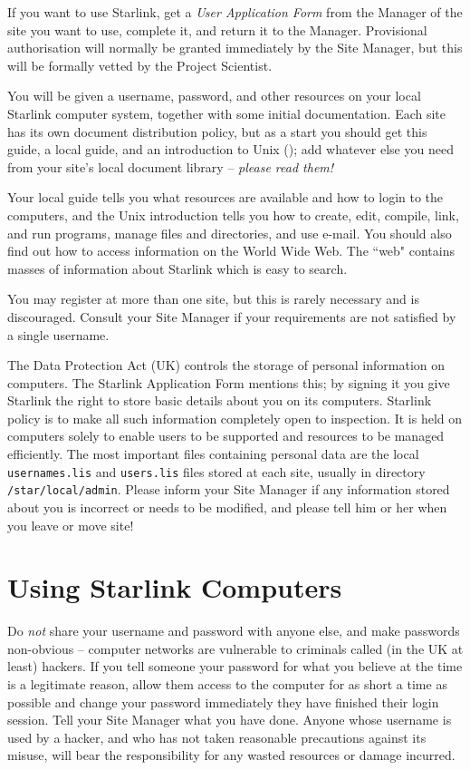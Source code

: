 If you want to use Starlink, get a {\em User Application Form}\/ from the
Manager of the site you want to use, complete it, and return it to the Manager.
Provisional authorisation will normally be granted immediately by the Site
Manager, but this will be formally vetted by the Project Scientist.

You will be given a username, password, and other resources on your local
Starlink computer system, together with some initial documentation.
Each site has its own document distribution policy, but as a start
you should get this guide, a local guide, and an introduction to Unix
();
add whatever else you need from your site's local document library --
{\em please read them!}

Your local guide tells you what resources are available and how to login to
the computers, and the Unix introduction tells you how to create, edit,
compile, link, and run programs, manage files and directories, and use e-mail.
You should also find out how to access information on the World Wide Web.
The ``web" contains masses of information about Starlink which is easy to
search.

You may register at more than one site, but this is rarely necessary and
is discouraged.
Consult your Site Manager if your requirements are not satisfied by a single
username.

The Data Protection Act (UK) controls the storage of personal information on
computers.
The Starlink Application Form mentions this; by signing it
you give Starlink the right to store basic details about you on its computers.
Starlink policy is to make all such information completely open to inspection.
It is held on computers solely to enable users to be supported and resources
to be managed efficiently.
The most important files containing personal data are the local
{\tt usernames.lis} and {\tt users.lis} files stored at each site,
usually in directory {\tt /star/local/admin}.
Please inform your Site Manager if any information stored about you is
incorrect or needs to be modified, and please tell him or her when you leave
or move site!

\newpage

\section{Using Starlink Computers}

Do {\em not}\/ share your username and password with anyone else, and make
passwords non-obvious -- computer networks are vulnerable to criminals called
(in the UK at least) hackers.
If you tell someone your password for what you believe at the time is a
legitimate reason, allow them access to the computer for as short a time as
possible and change your password immediately they have finished their login
session.
Tell your Site Manager what you have done.
Anyone whose username is used by a hacker, and who has not taken reasonable
precautions against its misuse, will bear the responsibility for any wasted
resources or damage incurred.

